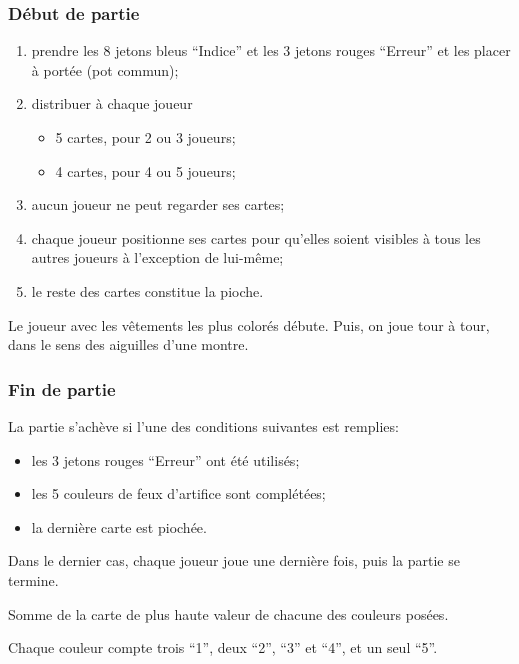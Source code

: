 \documentclass[11pt]{beamer}
\begin{document}
	\begin{frame}
		\frametitle{Début de partie}
		
		
		\begin{enumerate}
			\item prendre les 8 jetons bleus \enquote{Indice} et les 3 jetons rouges \enquote{Erreur} et les placer à portée (pot commun);
			\item distribuer à chaque joueur
				\begin{itemize}
					\item 5 cartes, pour 2 ou 3 joueurs;
					\item 4 cartes, pour 4 ou 5 joueurs;
				\end{itemize}
			\item \alert{aucun joueur ne peut regarder ses cartes};
			\item chaque joueur positionne ses cartes pour qu'elles soient visibles à tous les autres joueurs à l'exception de lui-même;
			\item le reste des cartes constitue la pioche.
		\end{enumerate}
	
		\vspace*{1ex}
	
		
		Le joueur avec les vêtements les plus colorés débute.
		Puis, on joue tour à tour, dans le sens des aiguilles d'une montre.
	\end{frame}


	\begin{frame}
		\frametitle{Fin de partie}
		
		\structure{Conditions}
		
		La partie s'achève si l'une des conditions suivantes est remplies:
		\begin{itemize}
			\item les 3 jetons rouges \enquote{Erreur} ont été utilisés;
			\item les 5 couleurs de feux d'artifice sont complétées;
			\item la dernière carte est piochée.
		\end{itemize}
	
		Dans le dernier cas, chaque joueur joue une dernière fois, puis la partie se termine.

		
		\vspace*{2ex}
		
		
		\structure{Score}
		
		Somme de la carte de plus haute valeur de chacune des couleurs posées.
		
		Chaque couleur compte trois \enquote{1}, deux \enquote{2}, \enquote{3} et \enquote{4}, et un seul \enquote{5}.
	\end{frame}
\end{document}
